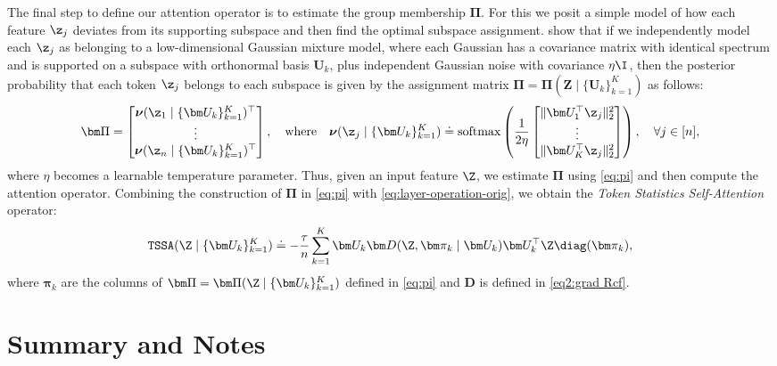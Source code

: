 \documentclass[../../book-main.tex]{subfiles}
\begin{document}
The final step to define our attention operator is to estimate the group membership $\bm\Pi$. For this we posit a simple model of how each feature \(\z_{j}\) deviates from its supporting subspace and then find the optimal subspace assignment. \cite{yu2023white} show that if we independently model each \(\z_{j}\) as belonging to a low-dimensional Gaussian mixture model, where each Gaussian has a covariance matrix with identical spectrum and is supported on a subspace with orthonormal basis \(\bm U_{k}\), plus independent Gaussian noise with covariance \(\eta \I\), then the posterior probability that each token \(\z_{j}\) belongs to each subspace is given by the assignment matrix \(\bm \Pi = \bm \Pi(\bm Z \mid \{\bm U_{k}\}_{k = 1}^{K})\) as follows:
\begin{align}\label{eq:pi}
    \bm \Pi = \begin{bmatrix} \boldsymbol{\nu}(\z_1 \mid \{\bm U_{k}\}_{k = 1}^{K})^\top \\ \vdots \\ \boldsymbol{\nu}(\z_n \mid \{\bm U_{k}\}_{k = 1}^{K})^\top \end{bmatrix}, \quad
\text{where} \quad 
\boldsymbol{\nu}(\z_j \mid \{\bm U_{k}\}_{k = 1}^{K}) \doteq \operatorname{softmax}\left( \frac{1}{2\eta} \begin{bmatrix} \|  \bm U_{1}^{\top} \z_j \|_2^2 \\ \vdots \\ \| \bm U_{K}^{\top} \z_j \|_2^2 \end{bmatrix} \right), \quad \forall j \in [n],
\end{align}
where $\eta$ becomes a learnable temperature parameter. Thus, given an input feature \(\Z\), we estimate \(\bm\Pi\) using \eqref{eq:pi} and then compute the attention operator.  Combining the construction of $\bm\Pi$ in \eqref{eq:pi} with 
\eqref{eq:layer-operation-orig}, we obtain the {\em Token Statistics Self-Attention} operator: 
\vspace{-3mm}
\begin{equation}
    \label{eq:tssa}
   \texttt{TSSA}(\Z \mid \{\bm U_{k}\}_{k = 1}^{K}) \doteq -\frac{\tau}{n}\sum_{k = 1}^{K}\bm U_{k}\bm D(\Z, \bm\pi_{k} \mid \bm U_{k})\bm U_{k}^{\top}\Z\diag(\bm \pi_{k}),
\end{equation}
where \(\bm\pi_{k}\) are the columns of \(\bm\Pi = \bm\Pi(\Z \mid \{\bm U_{k}\}_{k = 1}^{K})\) defined in \eqref{eq:pi} and \(\bm D\) is defined in \eqref{eq2:grad Rcf}. 




\section{Summary and Notes}
\end{document}

